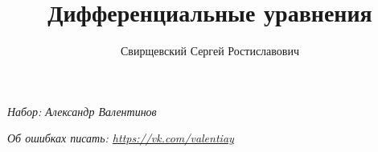 \documentclass{article}
\author{Свирщевский Сергей Ростиславович}
\title{Дифференциальные уравнения}
\begin{document}
  \begin{titlepage}
  \maketitle
  \begin{center}
  {\itshape\footnotesize Набор: Александр Валентинов}
  
  {\itshape\footnotesize Об ошибках писать: \url{https://vk.com/valentiay}}
  \end{center}
  \tableofcontents
  \vfill
  \end{titlepage}
  
  
  
  
  
  
  
\end{document}
